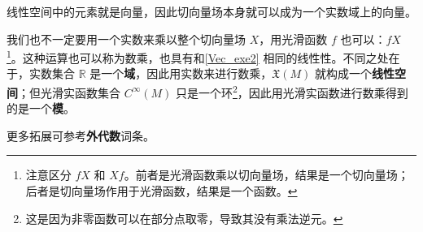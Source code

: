 线性空间中的元素就是向量，因此切向量场本身就可以成为一个实数域上的向量。

我们也不一定要用一个实数来乘以整个切向量场 $X$，用光滑函数 $f$ 也可以：$fX$\footnote{注意区分 $fX$ 和 $Xf$。前者是光滑函数乘以切向量场，结果是一个切向量场；后者是切向量场作用于光滑函数，结果是一个函数。}。这种运算也可以称为数乘，也具有和\autoref{Vec_exe2} 相同的线性性。不同之处在于，实数集合 $\mathbb{R}$ 是一个\textbf{域}，因此用实数来进行数乘，$\mathfrak{X}(M)$ 就构成一个\textbf{线性空间}；但光滑实函数集合 $C^\infty(M)$ 只是一个环\footnote{这是因为非零函数可以在部分点取零，导致其没有乘法逆元。}，因此用光滑实函数进行数乘得到的是一个\textbf{模}。

更多拓展可参考\textbf{外代数}词条。




